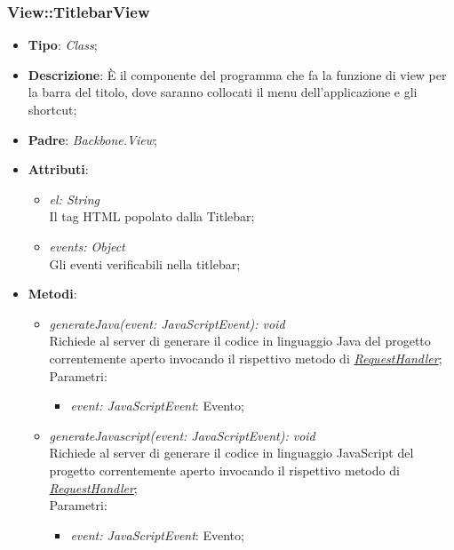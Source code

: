 \documentclass[../DefinizioneDiProdotto.tex]{subfiles}
\begin{document}
				\subsubsection{View::TitlebarView}
					\hypertarget{SWEDesigner::Client::View::TitlebarView}{}
					\begin{itemize}
						\item \textbf{Tipo}: \emph{Class};
						\item \textbf{Descrizione}: È il componente del programma che fa la funzione di view per la barra del titolo, dove saranno collocati il menu dell’applicazione e gli shortcut;
						\item \textbf{Padre}: \emph{Backbone.View};
						\item \textbf{Attributi}:
						\begin{itemize}
							\item \emph{el: String} \\
							Il tag HTML popolato dalla Titlebar;
							\item \emph{events: Object} \\
							Gli eventi verificabili nella titlebar;
						\end{itemize}
						\item \textbf{Metodi}:
						\begin{itemize}
							\item \emph{generateJava(event: JavaScriptEvent): void} \\
							Richiede al server di generare il codice in linguaggio Java del progetto correntemente aperto invocando il rispettivo metodo di \hyperlink{SWEDesigner::Model::RequestHandler}{\emph{RequestHandler}}; \\
							Parametri:
							\begin{itemize}
								\item \emph{event: JavaScriptEvent}: Evento;
							\end{itemize}
							\item \emph{generateJavascript(event: JavaScriptEvent): void} \\
							Richiede al server di generare il codice in linguaggio JavaScript del progetto correntemente aperto invocando il rispettivo metodo di \hyperlink{SWEDesigner::Model::RequestHandler}{\emph{RequestHandler}}; \\
							Parametri:
							\begin{itemize}
								\item \emph{event: JavaScriptEvent}: Evento;
							\end{itemize}

\end{itemize}
\end{itemize}
\end{document}
